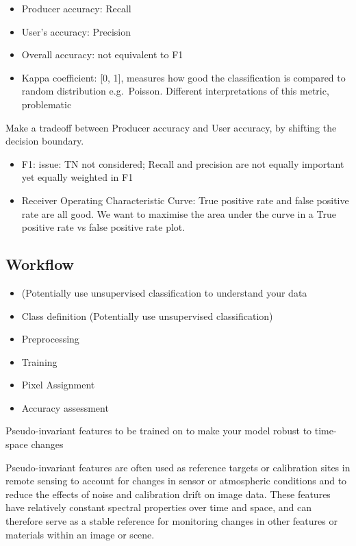 \documentclass[
  letterpaper,
  DIV=11,
  numbers=noendperiod]{scrreprt}
\begin{document}
\begin{itemize}
\item
  Producer accuracy: Recall
\item
  User's accuracy: Precision
\item
  Overall accuracy: not equivalent to F1
\item
  Kappa coefficient: {[}0, 1{]}, measures how good the classification is
  compared to random distribution e.g.~Poisson. Different
  interpretations of this metric, problematic
\end{itemize}

Make a tradeoff between Producer accuracy and User accuracy, by shifting
the decision boundary.

\begin{itemize}
\item
  F1: issue: TN not considered; Recall and precision are not equally
  important yet equally weighted in F1
\item
  Receiver Operating Characteristic Curve: True positive rate and false
  positive rate are all good. We want to maximise the area under the
  curve in a True positive rate vs false positive rate plot.
\end{itemize}

\hypertarget{workflow}{%
\subsection{Workflow}\label{workflow}}

\begin{itemize}
\item
  (Potentially use unsupervised classification to understand your data
\item
  Class definition (Potentially use unsupervised classification)
\item
  Preprocessing
\item
  Training
\item
  Pixel Assignment
\item
  Accuracy assessment
\end{itemize}

Pseudo-invariant features to be trained on to make your model robust to
time-space changes

Pseudo-invariant features are often used as reference targets or
calibration sites in remote sensing to account for changes in sensor or
atmospheric conditions and to reduce the effects of noise and
calibration drift on image data. These features have relatively constant
spectral properties over time and space, and can therefore serve as a
stable reference for monitoring changes in other features or materials
within an image or scene.
\end{document}
